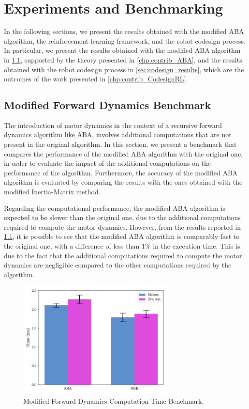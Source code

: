 \chapter{Experiments and Benchmarking}
\label{chp:contrib_ResultsDiscussion}

In the following sections, we present the results obtained with the modified \ac{ABA} algorithm, the reinforcement learning framework, and the robot codesign process. In particular, we present the results obtained with the modified \ac{ABA} algorithm in \cref{sec:results_fd_aba}, supported by the theory presented in \cref{chp:contrib_ABA},
and the results obtained with the robot codesign process in \cref{sec:codesign_results}, which are the outcomes of the work presented in \cref{chp:contrib_CodesignRL}.

\section{Modified Forward Dynamics Benchmark}
\label{sec:results_fd_aba}

The introduction of motor dynamics in the context of a recursive forward dynamics algorithm like \ac{ABA}, involves additional computations that are not present in the original algorithm. In this section, we present a benchmark that compares the performance of the modified \ac{ABA} algorithm with the original one, in order to evaluate the impact of the additional computations on the performance of the algorithm. Furthermore, the accuracy of the modified \ac{ABA} algorithm is evaluated by comparing the results with the ones obtained with the modified Inertia-Matrix method.

Regarding the computational performance, the modified \ac{ABA} algorithm is expected to be slower than the original one, due to the additional computations required to compute the motor dynamics. However, from the results reported in \cref{fig:fd_benchmark}, it is possible to see that the modified \ac{ABA} algorithm is comparably fast to the original one, with a difference of less than $1\%$ in the execution time. This is due to the fact that the additional computations required to compute the motor dynamics are negligible compared to the other computations required by the algorithm.

\begin{figure}
    \centering
    \caption{Modified Forward Dynamics Computation Time Benchmark.}
    \label{fig:fd_benchmark}
    \includegraphics[width=0.7\textwidth]{Images/Results/time_comparison_aba.png}
\end{figure}

